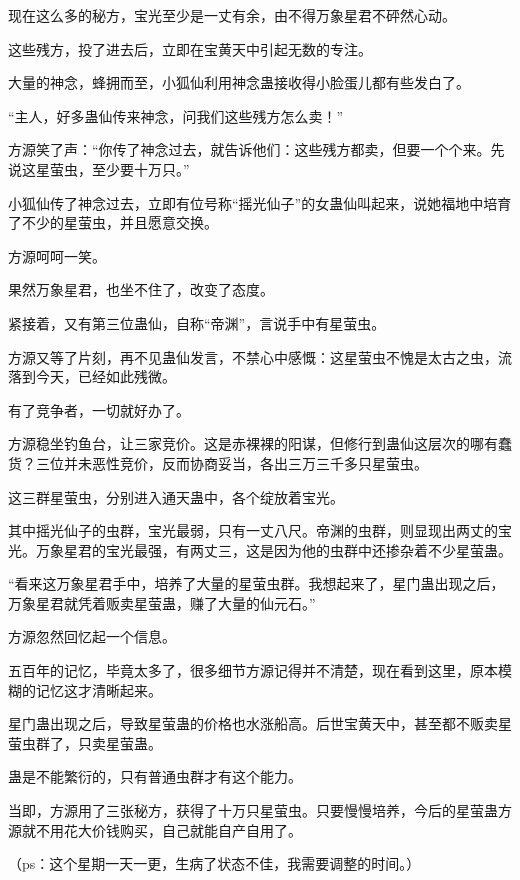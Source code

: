 \begin{this_body}
现在这么多的秘方，宝光至少是一丈有余，由不得万象星君不砰然心动。

这些残方，投了进去后，立即在宝黄天中引起无数的专注。

大量的神念，蜂拥而至，小狐仙利用神念蛊接收得小脸蛋儿都有些发白了。

“主人，好多蛊仙传来神念，问我们这些残方怎么卖！”

方源笑了声：“你传了神念过去，就告诉他们：这些残方都卖，但要一个个来。先说这星萤虫，至少要十万只。”

小狐仙传了神念过去，立即有位号称“摇光仙子”的女蛊仙叫起来，说她福地中培育了不少的星萤虫，并且愿意交换。

方源呵呵一笑。

果然万象星君，也坐不住了，改变了态度。

紧接着，又有第三位蛊仙，自称“帝渊”，言说手中有星萤虫。

方源又等了片刻，再不见蛊仙发言，不禁心中感慨：这星萤虫不愧是太古之虫，流落到今天，已经如此残微。

有了竞争者，一切就好办了。

方源稳坐钓鱼台，让三家竞价。这是赤裸裸的阳谋，但修行到蛊仙这层次的哪有蠢货？三位并未恶性竞价，反而协商妥当，各出三万三千多只星萤虫。

这三群星萤虫，分别进入通天蛊中，各个绽放着宝光。

其中摇光仙子的虫群，宝光最弱，只有一丈八尺。帝渊的虫群，则显现出两丈的宝光。万象星君的宝光最强，有两丈三，这是因为他的虫群中还掺杂着不少星萤蛊。

“看来这万象星君手中，培养了大量的星萤虫群。我想起来了，星门蛊出现之后，万象星君就凭着贩卖星萤蛊，赚了大量的仙元石。”

方源忽然回忆起一个信息。

五百年的记忆，毕竟太多了，很多细节方源记得并不清楚，现在看到这里，原本模糊的记忆这才清晰起来。

星门蛊出现之后，导致星萤蛊的价格也水涨船高。后世宝黄天中，甚至都不贩卖星萤虫群了，只卖星萤蛊。

蛊是不能繁衍的，只有普通虫群才有这个能力。

当即，方源用了三张秘方，获得了十万只星萤虫。只要慢慢培养，今后的星萤蛊方源就不用花大价钱购买，自己就能自产自用了。

（ps：这个星期一天一更，生病了状态不佳，我需要调整的时间。）

\end{this_body}

